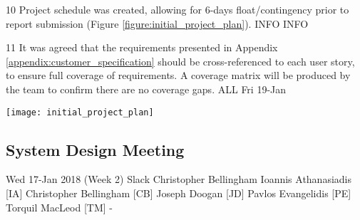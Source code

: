 \begin{momitems}
	\momitem
	{10}
	{Project schedule was created, allowing for 6-days float/contingency prior to report submission (Figure \ref{figure:initial_project_plan}).}
	{INFO}
	{INFO}

	\momitem
	{11}
	{It was agreed that the requirements presented in Appendix \ref{appendix:customer_specification} should be cross-referenced to each user story, to ensure full coverage of requirements. 
	A coverage matrix will be produced by the team to confirm there are no coverage gaps.}
	{ALL}
	{Fri 19-Jan}
\end{momitems}

\begin{center}
	\texttt{[image: initial\_project\_plan]}
	\label{figure:initial_project_plan}
\end{center}


\newpage
\subsection{System Design Meeting}

\momtoptable
{Wed 17-Jan 2018 (Week 2)}
{Slack}
{Christopher Bellingham}
{Ioannis Athanasiadis [IA]\newline
Christopher Bellingham [CB]\newline
Joseph Doogan [JD]\newline
Pavlos Evangelidis [PE]\newline
Torquil MacLeod [TM]}
{-}


